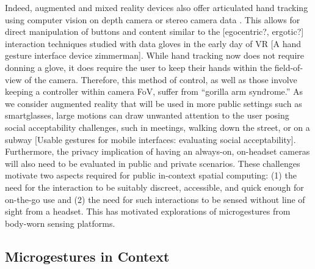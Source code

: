 \documentclass [11pt, proquest] {uwthesis}[2020/02/24]
\begin{document}
Indeed, augmented and mixed reality devices also offer articulated hand tracking using computer vision on depth camera or stereo camera data \cite{microsoft, MetaStore, TrackingUltraleap}. This allows for direct manipulation of buttons and content similar to the [egocentric?, ergotic?] interaction techniques studied with data gloves in the early day of VR [A hand gesture interface device zimmerman]. While hand tracking now does not require donning a glove, it does require the user to keep their hands within the field-of-view of the camera. Therefore, this method of control, as well as those involve keeping a controller within camera FoV, suffer from ``gorilla arm syndrome.'' As we consider augmented reality that will be used in more public settings such as smartglasses, large motions can draw unwanted attention to the user posing social acceptability challenges, such in meetings, walking down the street, or on a subway [Usable gestures for mobile interfaces: evaluating social acceptability]. Furthermore, the privacy implication of having an always-on, on-headset cameras will also need to be evaluated in public and private scenarios. These challenges motivate two aspects required for public in-context spatial computing: (1) the need for the interaction to be suitably discreet, accessible, and quick enough for on-the-go use and (2) the need for such interactions to be sensed without line of sight from a headset. This has motivated explorations of microgestures from body-worn sensing platforms.   %



\subsection{Microgestures in Context}
\end{document}

